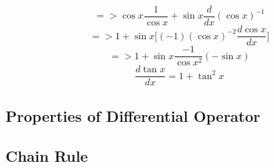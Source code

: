 	\begin{displaymath}
	=>\cos x \frac{1}{\cos x}+\sin x\frac{d}{dx}(\cos x)^{-1}
	\end{displaymath}
	\begin{displaymath}
	=> 1+\sin x\bigg[(-1)(\cos x)^{-2}\frac{d\cos x}{dx}\bigg]
	\end{displaymath}
	\begin{displaymath}
	=> 1+\sin x\frac{-1}{\cos x^2}(-\sin x)
	\end{displaymath}
	\begin{equation}
	\frac{d \tan x}{dx} = 1 + \tan^2 x
	\end{equation}

	\subsection{Properties of Differential Operator}
	\subsection{Chain Rule}
	
